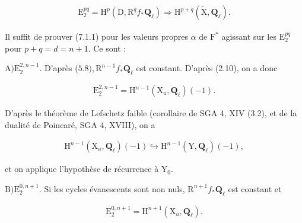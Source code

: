 \documentclass[10pt,leqno]{article}
\begin{document}
\begin{equation*}\begin{gathered}\mathrm{E}_{2}^{pq}=\mathrm{H}^{p}(\mathrm{D},\mathrm{R}^{q} f_{*}\mathbf{Q}_{\ell }) \Rightarrow  \mathrm{H}^{p+q}(\widetilde{\mathrm{X}},\mathbf{Q}_{\ell }).\end{gathered}\end{equation*}

\noindent Il suffit de prouver (7.1.1) pour les valeurs propres \(\alpha \) de \(\mathrm{F}^{*}\) agissant sur les \(\mathrm{E}_{2}^{pq}\) pour \(p+q=d=n+1\). Ce sont :\par

\noindent \(\mathrm{A}) \mathrm{E}_{2}^{2,n- 1}\). D’après (\(5.8), \mathrm{R}^{n- 1}f_{*}\mathbf{Q}_{\ell }\) est constant. D’après (2.10), on a donc\par

\begin{equation*}\begin{gathered}\mathrm{E}_{2}^{2,n- 1}=\mathrm{H}^{n- 1}(\mathrm{X}_{u},\mathbf{Q}_{\ell })(- 1).\end{gathered}\end{equation*}

\noindent D’après le théorème de Lefschetz faible (corollaire de SGA 4, XIV (3.2), et de la dualité de Poincaré, SGA 4, XVIII), on a\par

\begin{equation*}\begin{gathered}\mathrm{H}^{n- 1}(\mathrm{X}_{u},\mathbf{Q}_{\ell })(- 1) \hookrightarrow  \mathrm{H}^{n- 1}(\mathrm{Y},\mathbf{Q}_{\ell })(- 1),\end{gathered}\end{equation*}

\noindent et on applique l’hypothèse de récurrence à \(\mathrm{Y}_{0}\).\par

\noindent \(\mathrm{B}) \mathrm{E}_{2}^{0,n+1}\). Si les cycles évanescents sont non nuls, \(\mathrm{R}^{n+1}f_{*}\mathbf{Q}_{\ell }\) est constant et\par

\begin{equation*}\begin{gathered}\mathrm{E}_{2}^{0,n+1}=\mathrm{H}^{n+1}(\mathrm{X}_{u},\mathbf{Q}_{\ell }).\end{gathered}\end{equation*}
\end{document}
